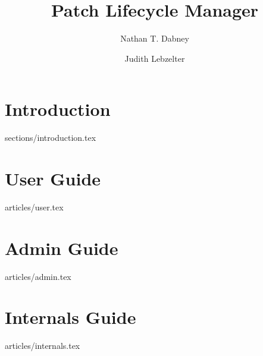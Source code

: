 \documentclass [twoside,12pt] {book}
\begin{document}
\title {Patch Lifecycle Manager}
\author {Nathan T. Dabney \and Judith Lebzelter}

\maketitle 
\tableofcontents

\chapter {Introduction}
 {sections/introduction.tex}
\chapter {User Guide}
 {articles/user.tex}
\chapter {Admin Guide}
 {articles/admin.tex}
\chapter {Internals Guide}
 {articles/internals.tex}

\printindex
\end{document}
